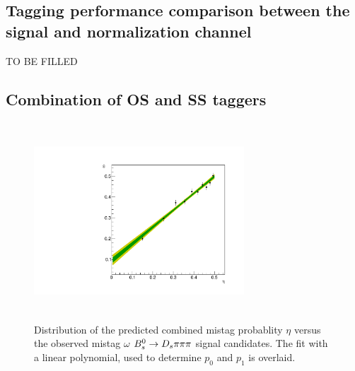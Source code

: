 \subsection{Tagging performance comparison between the signal and normalization channel}
\label{subsec: TaggingComparison}

TO BE FILLED



\subsection{Combination of OS and SS taggers}
\label{subsec: TaggingCombination}


\begin{figure}[h]
\centering
\includegraphics[height=7.4cm,width=0.7\textwidth]{figs/Tagging/TaggingCombinationCalibration.pdf}
\caption{Distribution of the predicted combined mistag probablity $\eta$ versus the observed mistag $\omega$ ${{B}^0_{s}}\rightarrow{\ensuremath{{D}_{s}}}{\ensuremath{\pi}}{\ensuremath{\pi}}{\ensuremath{\pi}}$ signal candidates. 
The fit with a linear polynomial, used to determine $p_{0}$ and $p_{1}$ is overlaid.}
\label{fig:TaggingCombinationCalibration}
\end{figure}
